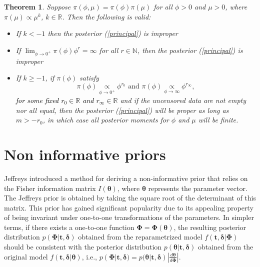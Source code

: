 \documentclass[]{interact}
\newcommand{\R}{\mathbb{R}}
\theoremstyle{plain}%
\newtheorem{theorem}{Theorem}[section]
\theoremstyle{definition}
\theoremstyle{remark}
\begin{document}
\begin{theorem}\label{mainth} Suppose $\pi(\phi,\mu) = \pi(\phi)\pi(\mu)$ for all $\phi>0$ and $\mu>0$, where $\pi(\mu)\propto \mu^k$, $k\in \mathbb{R}$. Then the following is valid:
\begin{itemize}
    \item[(i)] If $k< -1$ then the posterior (\ref{principal}) is improper
    \item[(ii)] If $\lim_{\phi\to 0^+}\pi(\phi)\phi^r = \infty$ for all $r\in \mathbb{N}$, then the posterior (\ref{principal}) is improper
    \item[(iii)] If $k\geq -1$, if $\pi(\phi)$ satisfy
    \begin{equation*} \pi(\phi)\underset{\phi\to 0^+}{\propto} \phi^{r_0}\mbox{ and }\pi(\phi)\underset{\phi\to \infty}{\propto} \phi^{r_\infty},
    \end{equation*}
    \textcolor{black}{for some fixed $r_0\in \R$ and $r_\infty\in \R$} and if the uncensored data are not empty nor all equal, then the posterior (\ref{principal}) will be proper as long as $m>-r_0$, in which case all posterior moments for $\phi$ and $\mu$ will be finite.
\end{itemize}

\end{theorem}

\section{Non informative priors}\label{sec:3}



Jeffreys \cite{jeffreys1946invariant} introduced a method for deriving a non-informative prior that relies on the Fisher information matrix $I(\boldsymbol{\theta})$, where $\boldsymbol{\theta}$ represents the parameter vector. The Jeffreys prior is obtained by taking the square root of the determinant of this matrix. This prior has gained significant popularity due to its appealing property of being invariant under one-to-one transformations of the parameters. In simpler terms, if there exists a one-to-one function $\boldsymbol{\Phi}=\boldsymbol{\Phi}(\boldsymbol{\theta})$, the resulting posterior distribution $p(\boldsymbol{\Phi}|\boldsymbol{t,\delta})$ obtained from the reparametrized model $f(\boldsymbol{t,\delta}|\boldsymbol{\Phi})$ should be consistent with the posterior distribution $p(\boldsymbol{\theta}|\boldsymbol{t,\delta})$ obtained from the original model $f(\boldsymbol{t,\delta}|\boldsymbol{\theta})$, i.e., $p(\boldsymbol{\Phi}|\boldsymbol{t,\delta})=p(\boldsymbol{\theta}|\boldsymbol{t,\delta})|\frac{d\boldsymbol{\theta}}{d\boldsymbol{\Phi}}|$.
\end{document}
